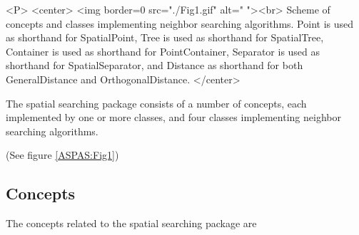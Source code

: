 \begin{ccHtmlOnly}

<P>
<center>
<img border=0 src="./Fig1.gif" alt=" "><br> 
Scheme of concepts and classes implementing neighbor searching algorithms.
Point is used as shorthand for SpatialPoint, Tree is used as shorthand for SpatialTree,
Container is used as shorthand for PointContainer, Separator is used as shorthand for SpatialSeparator,
and Distance as shorthand for both GeneralDistance and OrthogonalDistance.
</center>

\end{ccHtmlOnly}

The spatial searching package consists of a number of concepts, each implemented by
one or more classes, and four classes implementing neighbor 
searching algorithms. 
\begin{ccTexOnly}
(See figure \ref{ASPAS:Fig1}) 
\end{ccTexOnly}

\subsection{Concepts}

The concepts related to the spatial searching package are

